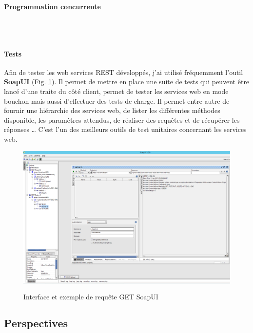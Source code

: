 \begin{itemize}
\paragraph{Programmation concurrente}
~\\
~\\

\paragraph{Tests}

Afin de tester les web services REST développés, j'ai utilisé fréquemment l'outil \textbf{SoapUI} (Fig. \ref{SoapUIGet}). Il permet de mettre en place une suite de tests qui peuvent être lancé d'une traite du côté client, permet de tester les services web en mode bouchon mais aussi d'effectuer des tests de charge. Il permet entre autre de fournir une hiérarchie des services web, de lister les différentes méthodes disponible, les paramètres attendus, de réaliser des requêtes et de récupérer les réponses … C'est l'un des meilleurs outils de test unitaires concernant les services web.\\

\begin{center}
\begin{figure}[h] \centering
\includegraphics[width=16cm]{images/soapUI_getById_sansResponse_small.png}\\
\caption{\label{SoapUIGet} Interface et exemple de requête \og GET \fg SoapUI}
\end{figure}
\end{center}


\subsection{Perspectives}


\end{itemize}
